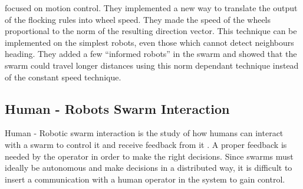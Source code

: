 \documentclass[oneside, a4paper, 12pt]{memoir}
\begin{document}
		\citet{ferrante2012self} focused on motion control. They implemented a new way to translate the output of the flocking rules into wheel speed. They made the speed of the wheels proportional to the norm of the resulting direction vector. This technique can be implemented on the simplest robots, even those which cannot detect neighbours heading. They added a few \enquote{informed robots} in the swarm and showed that the swarm could travel longer distances using this norm dependant technique instead of the constant speed technique.
					
	\subsection{Human - Robots Swarm Interaction}

	
	Human - Robotic swarm interaction is the study of how humans can interact with a swarm to control it and receive feedback from it \citep{brambilla2013swarm}. A proper feedback is needed by the operator in order to make the right decisions. Since swarms must ideally be autonomous and make decisions in a distributed way, it is difficult to insert a communication with a human operator in the system to gain control.
	
\end{document}
